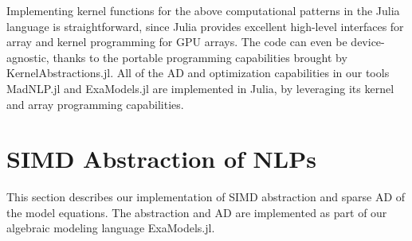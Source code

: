 \documentclass{IEEEtran4PSCC} %
\begin{document}
Implementing kernel functions for the above computational patterns in
the Julia language is straightforward, since Julia provides excellent
high-level interfaces for array and kernel programming for GPU
arrays. The code can even be device-agnostic, thanks to the portable
programming capabilities brought by KernelAbstractions.jl. All
of the AD and optimization capabilities in our
tools MadNLP.jl and ExaModels.jl are implemented in  Julia,
by leveraging its kernel and array programming capabilities.


\section{SIMD Abstraction of NLPs}\label{sec:simd}

This section describes our implementation of SIMD abstraction and
sparse AD of the model equations. The abstraction and AD are
implemented as part of our algebraic modeling language ExaModels.jl.
\end{document}
